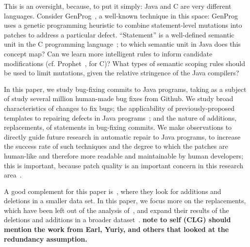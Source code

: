 \documentclass{sig-alternate-05-2015}
\newcommand{\todo}[1]
  {{\scriptsize \textbf{\color{red} {#1}}}}
\begin{document}
This is an oversight, because, to put it simply: Java and C are very different
languages.  Consider GenProg~\cite{genprog,cites}, a well-known technique in
this space: GenProg uses a genetic programming heuristic to combine
statement-level mutations into patches to address a particular defect.
``Statement'' is a well-defined semantic unit in the C programming
language~\cite{cspec}; to which semantic unit in Java does this concept map?
Can we learn more
intelligent rules to inform candidate modifications
(cf. Prophet~\cite{rinardPopl2016}, for C)?  What types of
semantic scoping rules should be used to limit mutations, given the relative
stringence of the Java compilers? 

In this paper, we study bug-fixing commits to Java programs, taking as a subject
of study several million human-made bug fixes from Github. We study broad
characteristics of changes to fix bugs; the applicability of previously-proposed
templates to repairing defects in Java programs~\cite{kim2013}; and the nature
of additions, replacements, of statements in bug-fixing commits. We make
observations to directly guide future research in automatic repair to Java
programs, to increase the success rate of such techniques and the degree to
which the patches are human-like and therefore more readable and maintainable by
human developers; this is important, because patch quality is an important
concern in this research area~\cite{Qi2013}.


A good complement for this paper is~\cite{zhong2015}, where they look for
additions and deletions in a smaller data set. In this paper, we focus more on
the replacements, which have been left out of the analysis of~\cite{zhong2015},
and expand their results of the deletions and additions in a broader
dataset~\cite{dyer2013}.
\todo{note to self (CLG) should mention the work from Earl, Yuriy, and others
  that looked at the redundancy assumption.}
\end{document}
